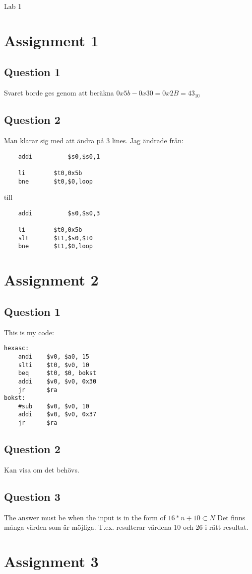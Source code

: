 \documentclass[a4paper,11p]{article}
\begin{document}
\begin{center}
Lab 1
\end{center}
\section{Assignment 1}
\subsection{Question 1}
Svaret borde ges genom att beräkna $0x5b - 0x30 = 0x2B = 43_{10}$
\subsection{Question 2}
Man klarar sig med att ändra på 3 lines. Jag ändrade från:
\begin{verbatim}
    addi	      $s0,$s0,1	
	
    li        $t0,0x5b
    bne       $t0,$0,loop
\end{verbatim}
till
\begin{verbatim}
    addi	      $s0,$s0,3	
	
    li        $t0,0x5b
    slt       $t1,$s0,$t0
    bne       $t1,$0,loop
\end{verbatim}
\section{Assignment 2}
\subsection{Question 1}
This is my code:
\begin{verbatim}
hexasc: 
    andi    $v0, $a0, 15
    slti    $t0, $v0, 10
    beq     $t0, $0, bokst
    addi    $v0, $v0, 0x30
    jr      $ra
bokst:	
    #sub    $v0, $v0, 10
    addi    $v0, $v0, 0x37
    jr      $ra	
\end{verbatim}
\subsection{Question 2}
Kan visa om det behövs.
\subsection{Question 3}
The answer must be when the input is in the form of $16*n + 10 \subset N$ Det finns många värden som är möjliga. T.ex. resulterar värdena 10 och 26 i rätt resultat.
\section{Assignment 3}
\end{document}
